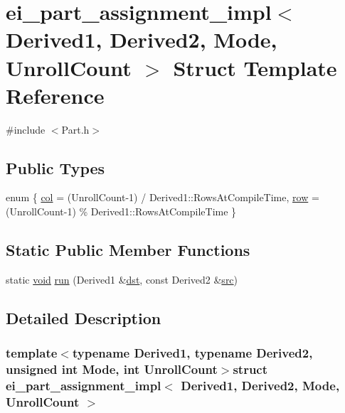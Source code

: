 \hypertarget{structei__part__assignment__impl}{\section{ei\-\_\-part\-\_\-assignment\-\_\-impl$<$ Derived1, Derived2, Mode, Unroll\-Count $>$ Struct Template Reference}
\label{structei__part__assignment__impl}
}


{\ttfamily \#include $<$Part.\-h$>$}

\subsection*{Public Types}
\begin{DoxyCompactItemize}
\item 
enum \{ \hyperlink{structei__part__assignment__impl_ae540caa55a1704d14df9aba20d8ebb92a970f4d33a7b9468a8b74fd313b8b9016}{col} = (Unroll\-Count-\/1) / Derived1\-:\-:Rows\-At\-Compile\-Time, 
\hyperlink{structei__part__assignment__impl_ae540caa55a1704d14df9aba20d8ebb92a0c2d5c68267ae914f863ab3c612b4b70}{row} = (Unroll\-Count-\/1) \% Derived1\-:\-:Rows\-At\-Compile\-Time
 \}
\end{DoxyCompactItemize}
\subsection*{Static Public Member Functions}
\begin{DoxyCompactItemize}
\item 
static \hyperlink{group___u_a_v_objects_plugin_ga444cf2ff3f0ecbe028adce838d373f5c}{void} \hyperlink{structei__part__assignment__impl_aaf57ad171372810b413909afe4c15860}{run} (Derived1 \&\hyperlink{glext_8h_a92034251bfd455d524a9b5610cddba00}{dst}, const Derived2 \&\hyperlink{glext_8h_a72e0fdf0f845ded60b1fada9e9195cd7}{src})
\end{DoxyCompactItemize}


\subsection{Detailed Description}
\subsubsection*{template$<$typename Derived1, typename Derived2, unsigned int Mode, int Unroll\-Count$>$struct ei\-\_\-part\-\_\-assignment\-\_\-impl$<$ Derived1, Derived2, Mode, Unroll\-Count $>$}



